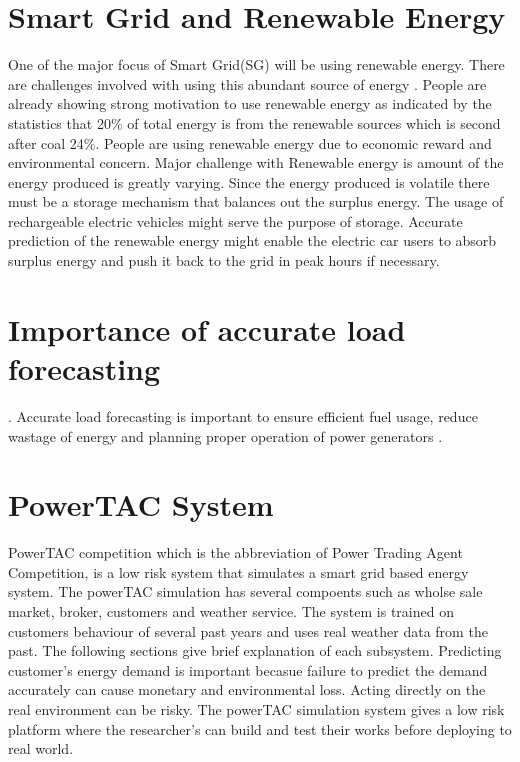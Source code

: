 \section{Smart Grid and Renewable Energy}
One of the major focus of Smart Grid(SG) will be using renewable energy. There are challenges involved with using this abundant source of energy \cite{richter2012transitioning}. People are already showing strong motivation to use renewable energy as indicated by the statistics that 20\% of total energy is from the renewable sources which is second after coal 24\%. People are using renewable energy due to economic reward and environmental concern. Major challenge with Renewable energy is amount of the energy produced is greatly varying. Since the energy produced is volatile there must be a storage mechanism that balances out the surplus energy. The usage of rechargeable electric vehicles might serve the purpose of storage. Accurate prediction of the renewable energy might enable the electric car users to absorb surplus energy and push it back to the grid in peak hours if necessary. 




\section{Importance of accurate load forecasting}.
Accurate load forecasting is important to ensure efficient fuel usage, reduce wastage of energy and planning proper operation of power generators \cite{liu2006accurate}.


\section{PowerTAC System}

PowerTAC competition which is the abbreviation of Power Trading Agent Competition, is a low risk system that simulates a smart grid based energy system. The powerTAC simulation has several compoents such as wholse sale market, broker, customers and weather service. The system is trained on customers behaviour of several past years and uses real weather data from the past. The following sections give brief explanation of each subsystem. 
Predicting customer's energy demand is important becasue failure to predict the demand accurately can cause monetary and environmental loss. Acting directly on the real environment can be risky. The powerTAC simulation system gives a low risk platform where the researcher's can build and test their works before deploying to real world. 


